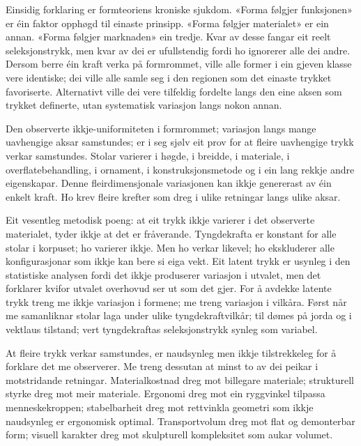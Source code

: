 
Einsidig forklaring er formteoriens kroniske sjukdom. «Forma følgjer funksjonen» er éin faktor opphøgd til einaste prinsipp. «Forma følgjer materialet» er ein annan. «Forma følgjer marknaden» ein tredje. Kvar av desse fangar eit reelt seleksjonstrykk, men kvar av dei er ufullstendig fordi ho ignorerer alle dei andre. Dersom berre éin kraft verka på formrommet, ville alle former i ein gjeven klasse vere identiske; dei ville alle samle seg i den regionen som det einaste trykket favoriserte. Alternativt ville dei vere tilfeldig fordelte langs den eine aksen som trykket definerte, utan systematisk variasjon langs nokon annan.

Den observerte ikkje-uniformiteten i formrommet; variasjon langs mange uavhengige aksar samstundes; er i seg sjølv eit prov for at fleire uavhengige trykk verkar samstundes. Stolar varierer i høgde, i breidde, i materiale, i overflatebehandling, i ornament, i konstruksjonsmetode og i ein lang rekkje andre eigenskapar. Denne fleirdimensjonale variasjonen kan ikkje genererast av éin enkelt kraft. Ho krev fleire krefter som dreg i ulike retningar langs ulike aksar.

Eit vesentleg metodisk poeng: at eit trykk ikkje varierer i det observerte materialet, tyder ikkje at det er fråverande. Tyngdekrafta er konstant for alle stolar i korpuset; ho varierer ikkje. Men ho verkar likevel; ho ekskluderer alle konfigurasjonar som ikkje kan bere si eiga vekt. Eit latent trykk er usynleg i den statistiske analysen fordi det ikkje produserer variasjon i utvalet, men det forklarer kvifor utvalet overhovud ser ut som det gjer. For å avdekke latente trykk treng me ikkje variasjon i formene; me treng variasjon i vilkåra. Først når me samanliknar stolar laga under ulike tyngdekraftvilkår; til dømes på jorda og i vektlaus tilstand; vert tyngdekraftas seleksjonstrykk synleg som variabel.


At fleire trykk verkar samstundes, er naudsynleg men ikkje tilstrekkeleg for å forklare det me observerer. Me treng dessutan at minst to av dei peikar i motstridande retningar. Materialkostnad dreg mot billegare materiale; strukturell styrke dreg mot meir materiale. Ergonomi dreg mot ein ryggvinkel tilpassa menneskekroppen; stabelbarheit dreg mot rettvinkla geometri som ikkje naudsynleg er ergonomisk optimal. Transportvolum dreg mot flat og demonterbar form; visuell karakter dreg mot skulpturell kompleksitet som aukar volumet.

